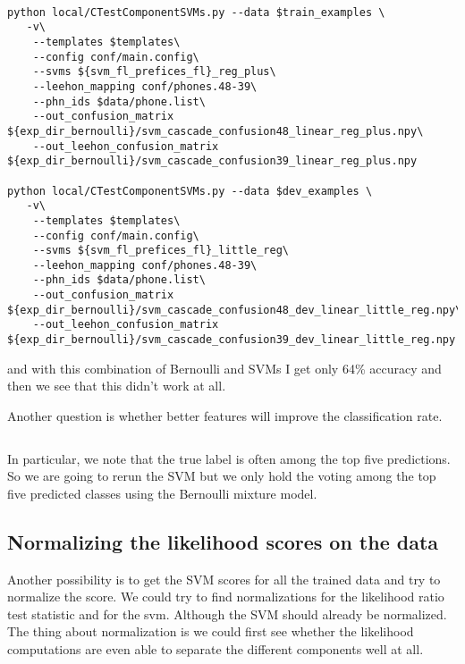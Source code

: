 \documentclass{article}
\begin{document}
\begin{verbatim}

python local/CTestComponentSVMs.py --data $train_examples \
   -v\
    --templates $templates\
    --config conf/main.config\
    --svms ${svm_fl_prefices_fl}_reg_plus\
    --leehon_mapping conf/phones.48-39\
    --phn_ids $data/phone.list\
    --out_confusion_matrix ${exp_dir_bernoulli}/svm_cascade_confusion48_linear_reg_plus.npy\
    --out_leehon_confusion_matrix ${exp_dir_bernoulli}/svm_cascade_confusion39_linear_reg_plus.npy

python local/CTestComponentSVMs.py --data $dev_examples \
   -v\
    --templates $templates\
    --config conf/main.config\
    --svms ${svm_fl_prefices_fl}_little_reg\
    --leehon_mapping conf/phones.48-39\
    --phn_ids $data/phone.list\
    --out_confusion_matrix ${exp_dir_bernoulli}/svm_cascade_confusion48_dev_linear_little_reg.npy\
    --out_leehon_confusion_matrix ${exp_dir_bernoulli}/svm_cascade_confusion39_dev_linear_little_reg.npy

\end{verbatim}
and with this combination of Bernoulli and SVMs I get only 64\% accuracy and then we see that this didn't work at all.

Another question is whether better features will improve the classification rate.

\begin{verbatim}

\end{verbatim}


  In particular, we note that the true label
is often among the top five predictions.  So we are going to
rerun the SVM but we only hold the voting among the top five
predicted classes using the Bernoulli mixture model.

\subsection{Normalizing the likelihood scores on the data}

Another possibility is to get the SVM scores for all the trained
data and try to normalize the score.  We could try to find
normalizations for the likelihood ratio test statistic
and for the svm.  Although the SVM should already be normalized.
The thing about normalization is we could first see
whether the likelihood computations are even able to separate the
different components well at all.
\end{document}
